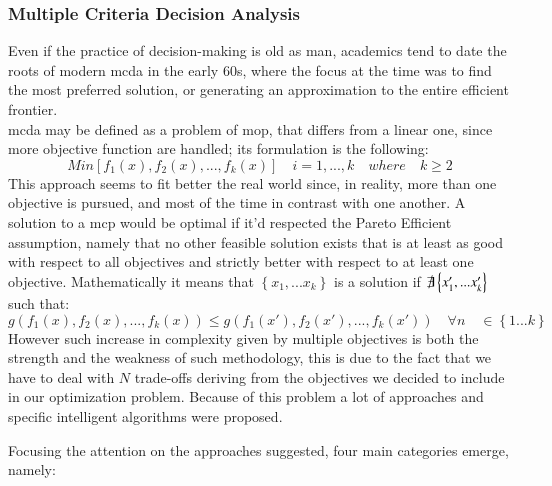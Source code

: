 \begin{doublespace}
\subsubsection{Multiple Criteria Decision Analysis}
Even if the practice of decision-making is old as man, academics tend to date the roots of modern \gls{mcda} in the early 60s, where the focus at the time was to find the most preferred solution, or generating an approximation to the entire efficient frontier\cite{Greco2016}.
\\
\gls{mcda} may be defined as a problem of \gls{mop}, that differs from a linear one,
since more objective function are handled; its formulation is the following:
	$$
	Min[f_1(x),f_2(x),...,f_k(x)] \quad i=1,...,k \quad where \quad k\geq2
	$$
This approach seems to fit better the real world since, in reality, more than one objective is pursued, and most of the time in contrast with one another.
A solution to a \gls{mcp} would be optimal if it'd respected the Pareto Efficient assumption, namely that no other feasible solution exists that is at least as good with respect to all objectives and strictly better with respect to at least one objective. Mathematically it means that $\left\{x_1,...x_k\right\}$ is a solution if $\not\exists \left\{x'_1,...x'_k\right\}$
such that:
	\[
	g(f_1(x),f_2(x),...,f_k(x)) \leq g(f_1(x'),f_2(x'),...,f_k(x')) \quad \forall n \quad \in  \left\{1...k\right\}
	\]
However such increase in complexity given by multiple objectives is both the strength and the weakness of such methodology, this is due to the fact that we have to deal with $N$ trade-offs deriving from the objectives we decided to include in our optimization problem. Because of this problem a lot of approaches and specific intelligent algorithms were proposed\cite{Cui2017}.

Focusing the attention on the approaches suggested, four main categories emerge, namely:


\end{doublespace}
